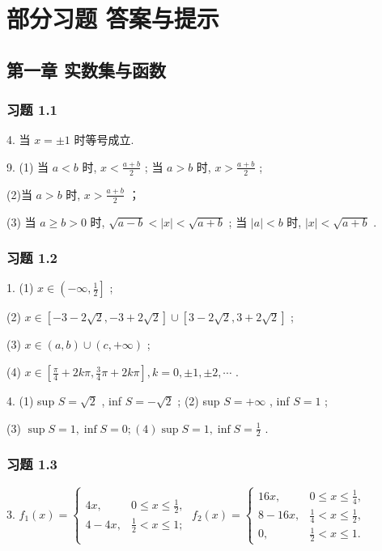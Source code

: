 \chapter{部分习题  答案与提示}

\section{第一章 实数集与函数}

\subsection{习题 1.1}

4. 当 \(x =  \pm  1\) 时等号成立.

9. (1) 当 \(a < b\) 时, \(x < \frac{a + b}{2}\) ; 当 \(a > b\) 时, \(x > \frac{a + b}{2}\) ;

(2)当 \(a > b\) 时, \(x > \frac{a + b}{2}\) ；

(3) 当 \(a \geq  b > 0\) 时, \(\sqrt{a - b} < \left| x\right|  < \sqrt{a + b}\) ; 当 \(\left| a\right|  < b\) 时, \(\left| x\right|  < \sqrt{a + b}\) .

\subsection{习题 1.2}

1. (1) \(x \in  \left( {-\infty ,\frac{1}{2}}\right\rbrack\) ;

(2) \(x \in  \left\lbrack  {-3 - 2\sqrt{2}, - 3 + 2\sqrt{2}}\right\rbrack   \cup  \left\lbrack  {3 - 2\sqrt{2},3 + 2\sqrt{2}}\right\rbrack\) ;

(3) \(x \in  \left( {a,b}\right)  \cup  \left( {c, + \infty }\right)\) ;

(4) \(x \in  \left\lbrack  {\frac{\pi }{4} + {2k\pi },\frac{3}{4}\pi  + {2k\pi }}\right\rbrack  ,k = 0, \pm  1, \pm  2,\cdots\) .

4. (1) sup \(S = \sqrt{2}\) , inf \(S =  - \sqrt{2}\) ; (2) sup \(S =  + \infty\) , inf \(S = 1\) ;

(3) \(\sup S = 1,\inf S = 0;\left( 4\right) \sup S = 1,\inf S = \frac{1}{2}\) .

\subsection{习题 1.3}

3. \({f}_{1}\left( x\right)  = \left\{  {\begin{matrix} {4x}, & 0 \leq  x \leq  \frac{1}{2}, \\  4 - {4x}, & \frac{1}{2} < x \leq  1; \end{matrix}\;{f}_{2}\left( x\right)  = \left\{  \begin{array}{ll} {16x}, & 0 \leq  x \leq  \frac{1}{4}, \\  8 - {16x}, & \frac{1}{4} < x \leq  \frac{1}{2}, \\  0, & \frac{1}{2} < x \leq  1. \end{array}\right. }\right.\)

